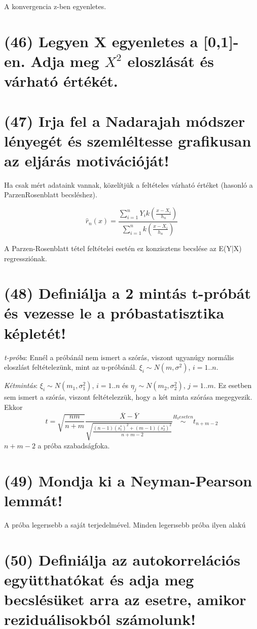 \documentclass[12p]{article}
\begin{document}
A konvergencia z-ben egyenletes.

\section{(46) Legyen X egyenletes a [0,1]-en. Adja meg $X^2$ eloszlását és várható értékét.}

\section{(47) Irja fel a Nadarajah módszer lényegét és szemléltesse grafikusan az eljárás motivációját! }

Ha csak mért adataink vannak, közelítjük a
feltételes várható értéket (hasonló a ParzenRosenblatt becsléshez).

$$\hat{r}_n(x) = \frac{\displaystyle{\sum^n_{i=1} Y_ik \left(\frac{x - X_i}{h_n}\right)}}{\displaystyle{\sum^n_{i=1} k \left(\frac{x - X_i}{h_n}\right)}}$$

A Parzen-Rosenblatt tétel feltételei esetén ez
konzisztens becslése az E(Y|X) regressziónak.

\section{(48) Definiálja a 2 mintás t-próbát és vezesse le a próbastatisztika képletét!}

\textit{t-próba}:	Ennél a próbánál nem ismert a szórás, viszont ugyanúgy normális eloszlást feltételezünk, mint az u-próbánál. $\xi_i \sim N(m, \sigma^2)$, $i=1..n$.

\textit{Kétmintás}: $\xi_i \sim N(m_1, \sigma_1^2)$, $i=1..n$ és $\eta_j \sim N(m_2, \sigma_2^2)$, $j=1..m$. Ez esetben sem ismert a szórás, viszont feltételezzük, hogy a két minta szórása megegyezik. Ekkor 
$$\displaystyle{t = \sqrt{\frac{nm}{n+m}}\frac{\overline{X} - \overline{Y}}{\sqrt{\frac{(n-1)(s^*_1)^2 + (m-1)(s^*_2)^2}{n+m-2}}} \stackrel{H_0 eseten}{\sim}
t_{n+m-2}}$$
$n+m-2$ a próba szabadságfoka.

\section{(49) Mondja ki a Neyman-Pearson lemmát!}

A próba legerısebb a saját terjedelmével. Minden legerısebb próba ilyen alakú

\section{(50) Definiálja az autokorrelációs együtthatókat és adja meg becslésüket arra az esetre, amikor reziduálisokból számolunk!}
\end{document}
